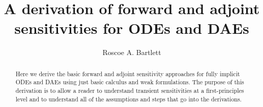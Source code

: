 \documentclass[pdf,ps2pdf,11pt]{SANDreport}
\title{
A derivation of forward and adjoint sensitivities for ODEs and DAEs
}
\author{Roscoe A. Bartlett}
\date{}
\begin{document}
\raggedright

\maketitle

%

%
\begin{abstract}
%
Here we derive the basic forward and adjoint sensitivity approaches for fully
implicit ODEs and DAEs using just basic calculus and weak formulations.  The
purpose of this derivation is to allow a reader to understand transient
sensitivities at a first-principles level and to understand all of the
assumptions and steps that go into the derivations.
%
\end{abstract}
%

%
%
%

%
\tableofcontents

\end{document}
